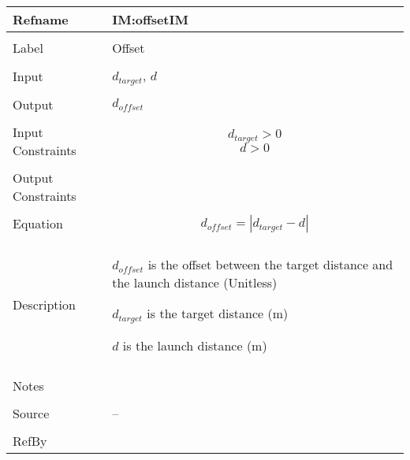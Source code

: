 \documentclass[12pt]{article}
\begin{document}
\noindent \begin{minipage}{\textwidth}
\begin{tabular}{p{} p{}}
\toprule \textbf{Refname} & \textbf{IM:offsetIM}
\label{IM:offsetIM}
\\ \midrule \\
Label & Offset
\\ \midrule \\
Input & ${d_{target}}$, $d$
\\ \midrule \\
Output & ${d_{offset}}$
\\ \midrule \\
Input Constraints & \begin{displaymath}
                    {d_{target}}>0
                    \end{displaymath}
                    \begin{displaymath}
                    d>0
                    \end{displaymath}
\\ \midrule \\
Output Constraints & 
\\ \midrule \\
Equation & \begin{displaymath}
           {d_{offset}}=|{d_{target}}-d|
           \end{displaymath}
\\ \midrule \\
Description & \begin{symbDescription}
              \item{${d_{offset}}$ is the offset between the target distance and the launch distance (Unitless)}
              \item{${d_{target}}$ is the target distance (m)}
              \item{$d$ is the launch distance (m)}
              \end{symbDescription}
\\ \midrule \\
Notes & 
\\ \midrule \\
Source & --
\\ \midrule \\
RefBy & 
\\ \bottomrule \end{tabular}
\end{minipage}
\par~
\end{document}
